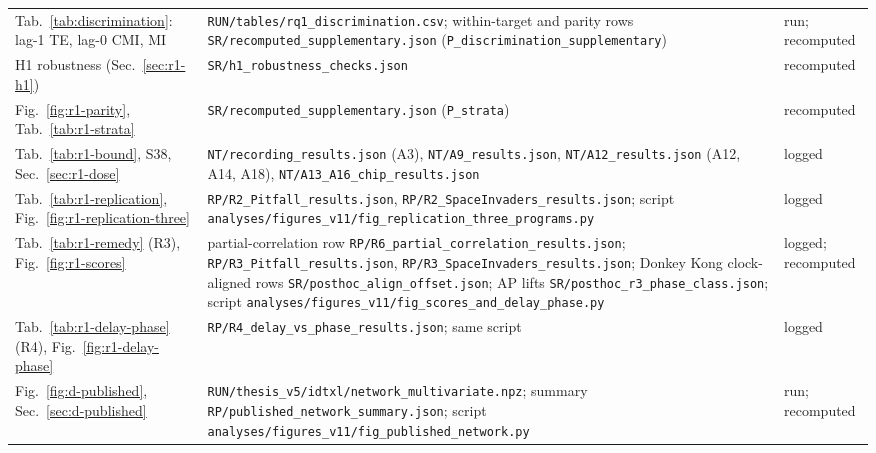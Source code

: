 \begin{longtable}{@{}L{0.25\textwidth}L{0.50\textwidth}L{0.19\textwidth}@{}}
Tab.~\ref{tab:discrimination}: lag-1 TE, lag-0 CMI, MI & \texttt{RUN/\allowbreak tables/\allowbreak rq1\_\allowbreak discrimination.csv}; within-target and parity rows \texttt{SR/\allowbreak recomputed\_\allowbreak supplementary.json} (\texttt{P\_\allowbreak discrimination\_\allowbreak supplementary}) & run; recomputed \\
H1 robustness (Sec.~\ref{sec:r1-h1}) & \texttt{SR/\allowbreak h1\_\allowbreak robustness\_\allowbreak checks.json} & recomputed \\
Fig.~\ref{fig:r1-parity}, Tab.~\ref{tab:r1-strata} & \texttt{SR/\allowbreak recomputed\_\allowbreak supplementary.json} (\texttt{P\_\allowbreak strata}) & recomputed \\
Tab.~\ref{tab:r1-bound}, S38, Sec.~\ref{sec:r1-dose} & \texttt{NT/\allowbreak recording\_\allowbreak results.json} (A3), \texttt{NT/\allowbreak A9\_\allowbreak results.json}, \texttt{NT/\allowbreak A12\_\allowbreak results.json} (A12, A14, A18), \texttt{NT/\allowbreak A13\_\allowbreak A16\_\allowbreak chip\_\allowbreak results.json} & logged \\
Tab.~\ref{tab:r1-replication}, Fig.~\ref{fig:r1-replication-three} & \texttt{RP/\allowbreak R2\_\allowbreak Pitfall\_\allowbreak results.json}, \texttt{RP/\allowbreak R2\_\allowbreak SpaceInvaders\_\allowbreak results.json}; script \texttt{analyses/\allowbreak figures\_\allowbreak v11/\allowbreak fig\_\allowbreak replication\_\allowbreak three\_\allowbreak programs.py} & logged \\
Tab.~\ref{tab:r1-remedy} (R3), Fig.~\ref{fig:r1-scores} & partial-correlation row \texttt{RP/\allowbreak R6\_\allowbreak partial\_\allowbreak correlation\_\allowbreak results.json}; \texttt{RP/\allowbreak R3\_\allowbreak Pitfall\_\allowbreak results.json}, \texttt{RP/\allowbreak R3\_\allowbreak SpaceInvaders\_\allowbreak results.json}; Donkey Kong clock-aligned rows \texttt{SR/\allowbreak posthoc\_\allowbreak align\_\allowbreak offset.json}; AP lifts \texttt{SR/\allowbreak posthoc\_\allowbreak r3\_\allowbreak phase\_\allowbreak class.json}; script \texttt{analyses/\allowbreak figures\_\allowbreak v11/\allowbreak fig\_\allowbreak scores\_\allowbreak and\_\allowbreak delay\_\allowbreak phase.py} & logged; recomputed \\
Tab.~\ref{tab:r1-delay-phase} (R4), Fig.~\ref{fig:r1-delay-phase} & \texttt{RP/\allowbreak R4\_\allowbreak delay\_\allowbreak vs\_\allowbreak phase\_\allowbreak results.json}; same script & logged \\
Fig.~\ref{fig:d-published}, Sec.~\ref{sec:d-published} & \texttt{RUN/\allowbreak thesis\_v5/\allowbreak idtxl/\allowbreak network\_\allowbreak multivariate.npz}; summary \texttt{RP/\allowbreak published\_\allowbreak network\_\allowbreak summary.json}; script \texttt{analyses/\allowbreak figures\_v11/\allowbreak fig\_\allowbreak published\_\allowbreak network.py} & run; recomputed \\

\end{longtable}
